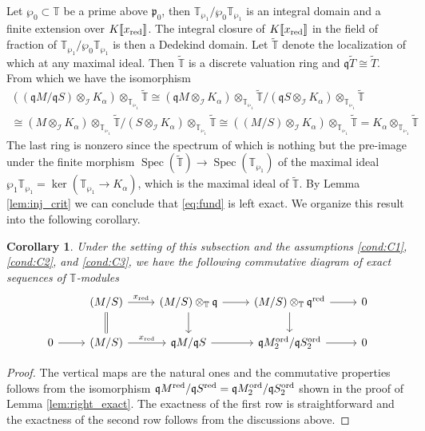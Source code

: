 \documentclass[leqno]{amsart}
\newtheorem{cor}[thm]{Corollary}
\theoremstyle{definition}
\theoremstyle{remark}
\DeclareMathOperator{\Spec}{Spec}
\newcommand{\fp}{\mathfrak{p}}
\newcommand{\fq}{\mathfrak{q}}
\newcommand{\red}{\textnormal{red}}
\newcommand{\xx}{x_\textnormal{red}}
\newcommand{\TT}{\mathbb{T}} %
\newcommand{\I}{\mathcal{I}} %
\newcommand{\ord}{\textnormal{ord}} %
\begin{document}
Let $\wp_0\subset \TT$ be a prime above $\fp_0$,
then $\TT_{\wp_1}/\wp_0\TT_{\wp_1}$
is an integral domain and a finite extension
over $K\llbracket\xx\rrbracket$.
The integral closure of $K\llbracket\xx\rrbracket$
in the field of fraction of 
$\TT_{\wp_1}/\wp_0\TT_{\wp_1}$ is then a Dedekind domain.
Let $\tilde{\TT}$ denote the localization of which
at any maximal ideal.
Then $\tilde{\TT}$ is a discrete valuation ring
and $\fq\tilde{T}\cong \tilde{T}$.
From which we have the isomorphism
\begin{multline*}
((\fq M/\fq S)\otimes_{\I} K_\alpha)
\otimes_{\TT_{\wp_1}}\tilde{\TT}\cong 
(\fq M\otimes_{\I} K_\alpha)
\otimes_{\TT_{\wp_1}}\tilde{\TT}/
(\fq S\otimes_{\I} K_\alpha)
\otimes_{\TT_{\wp_1}}\tilde{\TT}\\\cong
(M\otimes_{\I} K_\alpha)
\otimes_{\TT_{\wp_1}}\tilde{\TT}/
(S\otimes_{\I} K_\alpha)
\otimes_{\TT_{\wp_1}}\tilde{\TT}\cong
((M/S)\otimes_{\I} K_\alpha)
\otimes_{\TT_{\wp_1}}\tilde{\TT}=
K_\alpha \otimes_{\TT_{\wp_1}}\tilde{\TT}
\end{multline*}
The last ring is nonzero since 
the spectrum of which 
is nothing but the pre-image
under the finite morphism
$\Spec(\tilde{\TT})\to \Spec(\TT_{\wp_1})$
of the maximal ideal $\wp_1\TT_{\wp_1}=\ker(\TT_{\wp_1}\to K_\alpha)$,
which is the maximal ideal of $\tilde{\TT}$.
By Lemma \eqref{lem:inj_crit}
we can conclude that \eqref{eq:fund} is left exact.
We organize this result into the following corollary.


\begin{cor}\label{cor:fund}
	Under the setting of this subsection
    and the assumptions
    \ref{cond:C1},
    \ref{cond:C2}, and
    \ref{cond:C3},
    we have the following commutative diagram
    of exact sequences of $\TT$-modules
    \begin{equation}
    \begin{tikzcd}
    & (M/S)
    \arrow[r,"\xx"]\arrow[d,equal] &
    (M/S)\otimes_{\TT}\fq
    \arrow[r]\arrow[d] &
    (M/S)\otimes_{\TT}\fq^\red
    \arrow[r]\arrow[d] &0\\
    0\arrow[r] &
    (M/S)
    \arrow[r,"\xx"] &
    \fq M/\fq S
    \arrow[r] &
    \fq M_2^{\ord}/\fq S_2^{\ord}
    \arrow[r] &0
    \end{tikzcd}
    \end{equation}
\end{cor}
\begin{proof}
The vertical maps are the natural ones
and the commutative properties 
follows from the isomorphism
$\fq M^\red/\fq S^\red=\fq M_2^{\ord}/\fq S_2^{\ord}$
shown in the proof of Lemma \ref{lem:right_exact}.
The exactness of the first row
is straightforward and
the exactness of the second row
follows from the discussions above.
\end{proof}
\end{document}
